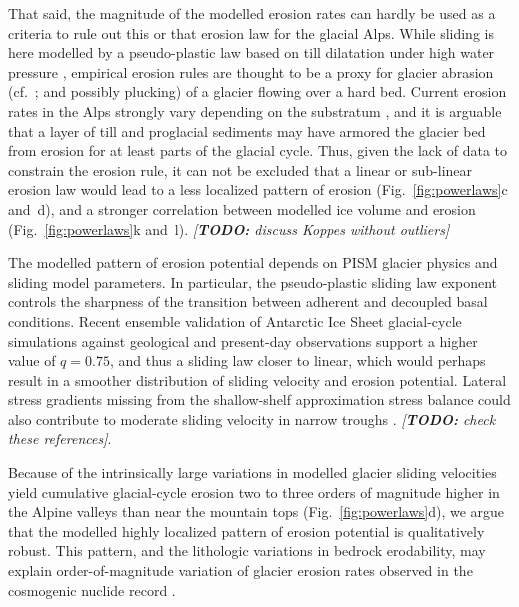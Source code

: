 \documentclass[esurf, manuscript]{copernicus}
\newcommand{\todo}[1]{\textcolor{Rd}{\emph{[\textbf{TODO:} #1]}}}
\begin{document}
    That said, the magnitude of the modelled erosion rates can hardly be used
    as a criteria to rule out this or that erosion law for the glacial Alps.
    While sliding is here modelled by a pseudo-plastic law based on
    till dilatation under high water pressure \citep{Tulaczyk.etal.2000},
    empirical erosion rules are thought to be a proxy for glacier abrasion
    (cf.~\citealp{Hallet.1979}; and possibly plucking) of a glacier flowing
    over a hard bed. Current erosion rates in the Alps strongly vary depending
    on the substratum \citep{Steinemann.etal.2020, Steinemann.etal.2021}, and
    it is arguable that a layer of till and proglacial sediments may have
    armored the glacier bed from erosion for at least parts of the glacial
    cycle. Thus, given the lack of data to constrain the erosion rule, it can
    not be excluded that a linear or sub-linear erosion law
    \citep[e.g.,][]{Cook.etal.2020} would lead to a less localized pattern of
    erosion (Fig.~\ref{fig:powerlaws}c and~d), and a stronger correlation
    between modelled ice volume and erosion (Fig.~\ref{fig:powerlaws}k and~l).
    \todo{discuss Koppes without outliers}

    The modelled pattern of erosion potential depends on PISM glacier physics
    and sliding model parameters. In particular, the pseudo-plastic sliding law
    exponent \citep[$q=0.25$ in][]{Seguinot.etal.2018} controls the sharpness
    of the transition between adherent and decoupled basal conditions. Recent
    ensemble validation of Antarctic Ice Sheet glacial-cycle simulations
    against geological and present-day observations \citep{Albrecht.etal.2020,
    Albrecht.etal.2020a} support a higher value of $q=0.75$, and thus a
    sliding law closer to linear, which would perhaps result in a smoother
    distribution of sliding velocity and erosion potential. Lateral stress
    gradients missing from the shallow-shelf approximation stress balance could
    also contribute to moderate sliding velocity in narrow troughs
    \citep{Herman.etal.2011, Egholm.etal.2012, Egholm.etal.2012a,
    Pedersen.etal.2014}. \todo{check these references}.

    Because of the intrinsically large variations in modelled glacier sliding
    velocities yield cumulative glacial-cycle erosion two to three orders of
    magnitude higher in the Alpine valleys than near the mountain tops
    (Fig.~\ref{fig:powerlaws}d), we argue that the modelled highly localized
    pattern of erosion potential is qualitatively robust. This pattern, and
    the lithologic variations in bedrock erodability, may explain
    order-of-magnitude variation of glacier erosion rates observed in the
    cosmogenic nuclide record \citep{Jansen.etal.2019, Steinemann.etal.2020,
    Steinemann.etal.2021}.
\end{document}
